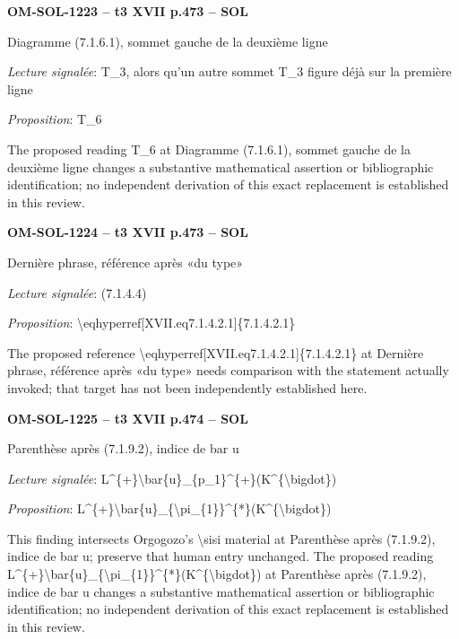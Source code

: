 \par\noindent\textbf{OM-SOL-1223 -- t3 XVII p.473 -- SOL}\par
Diagramme (7.1.6.1), sommet gauche de la deuxième ligne\par
\emph{Lecture signalée}: T\_3, alors qu'un autre sommet T\_3 figure déjà sur la première ligne\par
\emph{Proposition}: T\_6\par
The proposed reading T\_6 at Diagramme (7.1.6.1), sommet gauche de la deuxième ligne changes a substantive mathematical assertion or bibliographic identification; no independent derivation of this exact replacement is established in this review.\par
\par\noindent\textbf{OM-SOL-1224 -- t3 XVII p.473 -- SOL}\par
Dernière phrase, référence après «du type»\par
\emph{Lecture signalée}: (7.1.4.4)\par
\emph{Proposition}: \textbackslash{}eqhyperref[XVII.eq7.1.4.2.1]\{7.1.4.2.1\}\par
The proposed reference \textbackslash{}eqhyperref[XVII.eq7.1.4.2.1]\{7.1.4.2.1\} at Dernière phrase, référence après «du type» needs comparison with the statement actually invoked; that target has not been independently established here.\par
\par\noindent\textbf{OM-SOL-1225 -- t3 XVII p.474 -- SOL}\par
Parenthèse après (7.1.9.2), indice de bar u\par
\emph{Lecture signalée}: L\textasciicircum{}\{+\}\textbackslash{}bar\{u\}\_\{p\_1\}\textasciicircum{}\{+\}(K\textasciicircum{}\{\textbackslash{}bigdot\})\par
\emph{Proposition}: L\textasciicircum{}\{+\}\textbackslash{}bar\{u\}\_\{\textbackslash{}pi\_\{1\}\}\textasciicircum{}\{*\}(K\textasciicircum{}\{\textbackslash{}bigdot\})\par
This finding intersects Orgogozo's \textbackslash{}sisi material at Parenthèse après (7.1.9.2), indice de bar u; preserve that human entry unchanged. The proposed reading L\textasciicircum{}\{+\}\textbackslash{}bar\{u\}\_\{\textbackslash{}pi\_\{1\}\}\textasciicircum{}\{*\}(K\textasciicircum{}\{\textbackslash{}bigdot\}) at Parenthèse après (7.1.9.2), indice de bar u changes a substantive mathematical assertion or bibliographic identification; no independent derivation of this exact replacement is established in this review.\par
